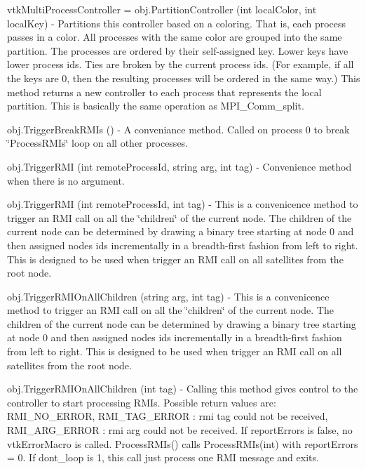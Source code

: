 \begin{DoxyItemize}
\item {\ttfamily vtk\-Multi\-Process\-Controller = obj.\-Partition\-Controller (int local\-Color, int local\-Key)} -\/ Partitions this controller based on a coloring. That is, each process passes in a color. All processes with the same color are grouped into the same partition. The processes are ordered by their self-\/assigned key. Lower keys have lower process ids. Ties are broken by the current process ids. (For example, if all the keys are 0, then the resulting processes will be ordered in the same way.) This method returns a new controller to each process that represents the local partition. This is basically the same operation as M\-P\-I\-\_\-\-Comm\-\_\-split.  
\item {\ttfamily obj.\-Trigger\-Break\-R\-M\-Is ()} -\/ A conveniance method. Called on process 0 to break \char`\"{}\-Process\-R\-M\-Is\char`\"{} loop on all other processes.  
\item {\ttfamily obj.\-Trigger\-R\-M\-I (int remote\-Process\-Id, string arg, int tag)} -\/ Convenience method when there is no argument.  
\item {\ttfamily obj.\-Trigger\-R\-M\-I (int remote\-Process\-Id, int tag)} -\/ This is a convenicence method to trigger an R\-M\-I call on all the \char`\"{}children\char`\"{} of the current node. The children of the current node can be determined by drawing a binary tree starting at node 0 and then assigned nodes ids incrementally in a breadth-\/first fashion from left to right. This is designed to be used when trigger an R\-M\-I call on all satellites from the root node.  
\item {\ttfamily obj.\-Trigger\-R\-M\-I\-On\-All\-Children (string arg, int tag)} -\/ This is a convenicence method to trigger an R\-M\-I call on all the \char`\"{}children\char`\"{} of the current node. The children of the current node can be determined by drawing a binary tree starting at node 0 and then assigned nodes ids incrementally in a breadth-\/first fashion from left to right. This is designed to be used when trigger an R\-M\-I call on all satellites from the root node.  
\item {\ttfamily obj.\-Trigger\-R\-M\-I\-On\-All\-Children (int tag)} -\/ Calling this method gives control to the controller to start processing R\-M\-Is. Possible return values are\-: R\-M\-I\-\_\-\-N\-O\-\_\-\-E\-R\-R\-O\-R, R\-M\-I\-\_\-\-T\-A\-G\-\_\-\-E\-R\-R\-O\-R \-: rmi tag could not be received, R\-M\-I\-\_\-\-A\-R\-G\-\_\-\-E\-R\-R\-O\-R \-: rmi arg could not be received. If report\-Errors is false, no vtk\-Error\-Macro is called. Process\-R\-M\-Is() calls Process\-R\-M\-Is(int) with report\-Errors = 0. If dont\-\_\-loop is 1, this call just process one R\-M\-I message and exits.  

\end{DoxyItemize}
